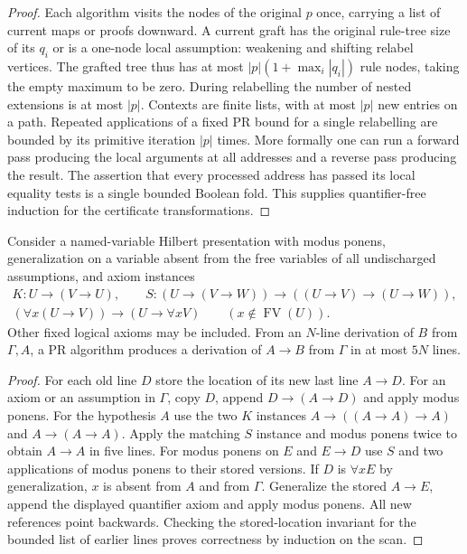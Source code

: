 \begin{proof}
Each algorithm visits the nodes of the original $p$ once, carrying a
list of current maps or proofs downward. A current graft has the original
rule-tree size of its $q_i$ or is a one-node local assumption: weakening
and shifting relabel vertices. The grafted tree thus has at most
$|p|(1+\max_i |q_i|)$ rule nodes, taking the empty maximum to be zero.
During relabelling the number of nested extensions is at most $|p|$.
Contexts are finite lists, with at most $|p|$ new entries on a path.
Repeated applications of a fixed PR bound for a single relabelling
are bounded by its primitive iteration $|p|$ times. More formally one
can run a forward pass producing the local arguments at all addresses
and a reverse pass producing the result. The assertion that every
processed address has passed its local equality tests is a single
bounded Boolean fold. This supplies quantifier-free induction for the
certificate transformations.
\end{proof}

\begin{proposition}\label{prop:hilbert-ded}
Consider a named-variable Hilbert presentation with modus ponens,
generalization on a variable absent from the free variables of all
undischarged assumptions, and axiom instances
\[
 \begin{gathered}
  K: U\to(V\to U),\qquad
  S:(U\to(V\to W))\to((U\to V)\to(U\to W)),\\
  (\forall x(U\to V))\to(U\to\forall x V)
       \qquad(x\notin\operatorname{FV}(U)).
 \end{gathered}
\]
Other fixed logical axioms may be included. From an $N$-line derivation
of $B$ from $\Gamma,A$, a PR algorithm produces a derivation of $A\to B$
from $\Gamma$ in at most $5N$ lines.
\end{proposition}
\begin{proof}
For each old line $D$ store the location of its new last line $A\to D$.
For an axiom or an assumption in $\Gamma$, copy $D$, append
$D\to(A\to D)$ and apply modus ponens. For the hypothesis $A$ use the
two $K$ instances $A\to((A\to A)\to A)$ and $A\to(A\to A)$.
Apply the matching $S$ instance and modus ponens twice to obtain
$A\to A$ in five lines. For modus ponens on $E$ and $E\to D$ use $S$
and two applications of modus ponens to their stored versions. If $D$
is $\forall x E$ by generalization, $x$ is absent from $A$ and from
$\Gamma$. Generalize the stored $A\to E$, append the displayed
quantifier axiom and apply modus ponens. All new references point
backwards. Checking the stored-location invariant for the bounded
list of earlier lines proves correctness by induction on the scan.
\end{proof}


